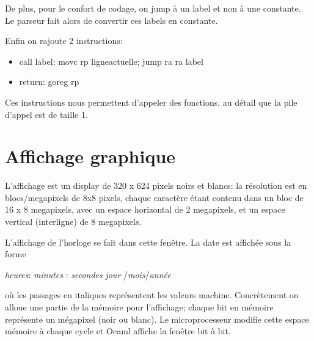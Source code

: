 \documentclass[12pt,a4paper,french]{article}
\begin{document}
\;

De plus, pour le confort de codage, on jump à un label et non à une constante. Le parseur fait alors de convertir ces labels en constante.

Enfin on rajoute 2 instructions:

\begin{itemize}
    \item call label: movc rp ligneactuelle; jump ra ra label
    \item return: goreg rp
\end{itemize}

Ces instructions nous permettent d'appeler des fonctions, au détail que la pile d'appel est de taille 1.

\section{Affichage graphique}

L'affichage est un display de 320 x 624 pixels noirs et blancs: la résolution est en blocs/megapixels de 8x8 pixels, chaque caractère étant contenu dans un bloc de 16 x 8 megapixels, avec un espace horizontal de 2 megapixels, et un espace vertical (interligne) de 8 megapixels.

L'affichage de l'horloge se fait dans cette fenêtre. La date est affichée sous la forme 

\textit {heures}: \textit {minutes} : \textit {secondes}  \newline \textit {jour} /\textit {mois}/\textit {année} 


où les passages en italiques représentent les valeurs machine.
Concrètement on alloue une partie de la mémoire pour l'affichage; chaque bit en mémoire représente un mégapixel (noir ou blanc). Le microprocesseur modifie cette espace mémoire à chaque cycle et Ocaml affiche la fenêtre bit à bit.
\end{document}

